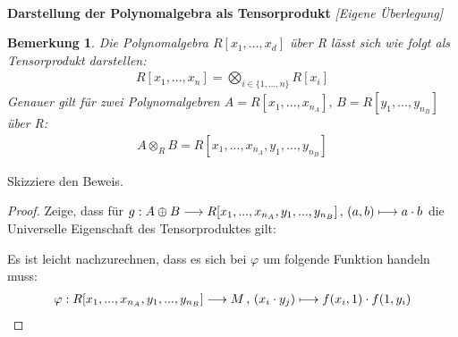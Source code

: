 \documentclass[10pt,a4paper]{report}
\newcounter{Aussage}[chapter]
\newtheorem{bem}[Aussage]{Bemerkung}
\newcommand{\function}[5]{\nolinebreak{#1:#2 \longrightarrow #3 \, , \, #4 \longmapsto #5}}
\newcommand{\Tensor}[3]{#1 \otimes_{#2} #3}
\begin{document}
\ \\
\textbf{Darstellung der Polynomalgebra als Tensorprodukt} \textit{[Eigene Überlegung]}
\begin{bem}\label{Darstellung der Polynomalgebra als Tensorprodukt}
Die Polynomalgebra $R[x_1,...,x_d]$ über R lässt sich wie folgt als Tensorprodukt darstellen:
\begin{gather*}
R[x_1,...,x_n] = \bigotimes_{i \in \lbrace 1,...,n \rbrace} R[x_i]
\end{gather*}
Genauer gilt für zwei Polynomalgebren $A = R[x_1,...,x_{n_A}], \, B = R[y_1,...,y_{n_B}]$ über R:
\begin{gather*}
\Tensor{A}{R}{B}  = R[x_1,...,x_{n_A},y_1,...,y_{n_B}]
\end{gather*}
\end{bem}
Skizziere den Beweis.
\begin{proof}
Zeige, dass für $\function{g}{A \oplus B}{R[x_1,...,x_{n_A},y_1,...,y_{n_B}]}{(a,b)}{a \cdot b}$ die Universelle Eigenschaft des Tensorproduktes gilt:
\begin{center}
\end{center}
Es ist leicht nachzurechnen, dass es sich bei $\varphi$ um folgende Funktion handeln muss:
\begin{gather*}
\function{\varphi}{R[x_1,...,x_{n_A},y_1,...,y_{n_B}]}{M}{(x_i \cdot y_j)}{f(x_i,1) \cdot f(1,y_i)}
\end{gather*}
\end{proof}
\end{document}
